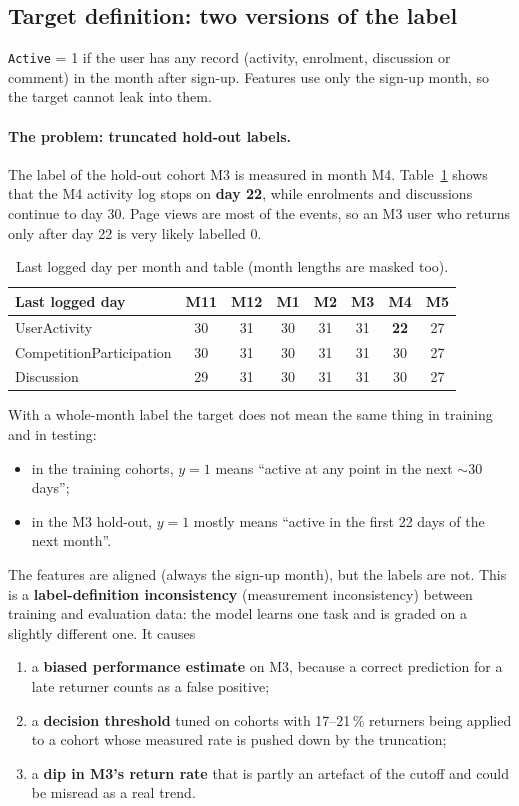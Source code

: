 \documentclass[11pt,a4paper]{article}
\newcommand{\code}[1]{\texttt{#1}}
\begin{document}
\subsection{Target definition: two versions of the label}\label{sec:labels}
\code{Active} = 1 if the user has any record (activity, enrolment, discussion or comment) in the month after sign-up.
Features use only the sign-up month, so the target cannot leak into them.

\paragraph{The problem: truncated hold-out labels.} The label of the hold-out cohort M3 is measured in month M4.
Table~\ref{tab:lastday} shows that the M4 activity log stops on \textbf{day 22}, while enrolments and discussions continue to day 30.
Page views are most of the events, so an M3 user who returns only after day 22 is very likely labelled 0.

\begin{table}[H]\centering\small
\begin{tabular}{lccccccc}\toprule
Last logged day & M11 & M12 & M1 & M2 & M3 & \textbf{M4} & M5\\\midrule
UserActivity & 30 & 31 & 30 & 31 & 31 & \textbf{22} & 27\\
CompetitionParticipation & 30 & 31 & 30 & 31 & 31 & 30 & 27\\
Discussion & 29 & 31 & 30 & 31 & 31 & 30 & 27\\\bottomrule
\end{tabular}
\caption{Last logged day per month and table (month lengths are masked too).}\label{tab:lastday}
\end{table}

With a whole-month label the target does not mean the same thing in training and in testing:
\begin{itemize}
  \item in the training cohorts, $y=1$ means ``active at any point in the next $\sim$30 days'';
  \item in the M3 hold-out, $y=1$ mostly means ``active in the first 22 days of the next month''.
\end{itemize}
The features are aligned (always the sign-up month), but the labels are not. This is a \textbf{label-definition inconsistency}
(measurement inconsistency) between training and evaluation data: the model learns one task and is graded on a slightly different one. It causes
\begin{enumerate}
  \item a \textbf{biased performance estimate} on M3, because a correct prediction for a late returner counts as a false positive;
  \item a \textbf{decision threshold} tuned on cohorts with 17--21\,\% returners being applied to a cohort whose measured rate is pushed down by the truncation;
  \item a \textbf{dip in M3's return rate} that is partly an artefact of the cutoff and could be misread as a real trend.
\end{enumerate}
\end{document}
